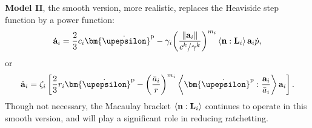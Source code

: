 \textbf{Model II}, the smooth version, more realistic, replaces the Heaviside step function by a power function:
\begin{equation}
{{\dot{\bf a}}_i} = \frac{2}{3}{c_i}{{\bm{\dot \upepsilon }}^{\rm{p}}} - {\gamma _i}{\left( {\frac{{\left\| {{{\bf{a}}_i}} \right\|}}{{{c^k}/{\gamma ^k}}}} \right)^{{m_i}}}\left\langle {{\bf{n}}:{{\bf{L}}_i}} \right\rangle {{\bf{a}}_i}\dot p,
\end{equation}
or
\begin{equation}
{{\dot{\bf a}}_i} = {\zeta _i}\left[ {\frac{2}{3}{r_i}{{{\bm{\dot \upepsilon }}}^{\rm{p}}} - {{\left( {\frac{{{{\bar a}_i}}}{r}} \right)}^{{m_i}}}\left\langle {{{{\bm{\dot \upepsilon }}}^{\rm{p}}}:\frac{{{{\bf{a}}_i}}}{{{{\bar a}_i}}}} \right\rangle {{\bf{a}}_i}} \right].
\end{equation}
Though not necessary, the Macaulay bracket $\left\langle {{\bf{n}}:{{\bf{L}}_i}} \right\rangle$ continues to operate in this smooth version, and will play a significant role in reducing ratchetting.

